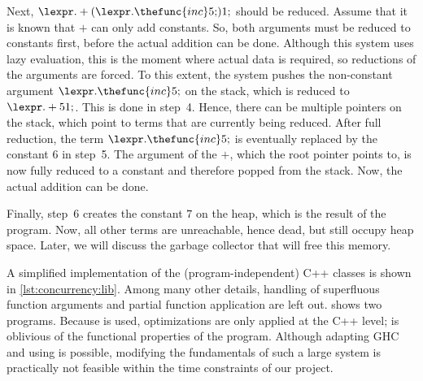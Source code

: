 Next, $\lexpr.+ ({\lexpr.\thefunc{inc} 5;}) 1;$ should be reduced.
Assume that it is known that $+$ can only add constants.
So, both arguments must be reduced to constants first, before the actual addition can be done.
Although this system uses lazy evaluation, this is the moment where actual data is required, so reductions of the arguments are forced.
To this extent, the system pushes the non-constant argument $\lexpr.\thefunc{inc} 5;$ on the stack, which is reduced to $\lexpr.+ 5 1;$.
This is done in step~4.
Hence, there can be multiple pointers on the stack, which point to terms that are currently being reduced.
After full reduction, the term $\lexpr.\thefunc{inc} 5;$ is eventually replaced by the constant $6$ in step~5.
The argument of the $+$, which the root pointer points to, is now fully reduced to a constant and therefore popped from the stack.
Now, the actual addition can be done.

Finally, step~6 creates the constant $7$ on the heap, which is the result of the program.
Now, all other terms are unreachable, hence dead, but still occupy heap space.
Later, we will discuss the garbage collector that will free this memory.

A simplified implementation of the (program-independent) C++ classes is shown in \vref{lst:concurrency:lib}.
Among many other details, handling of superfluous function arguments and partial function application are left out.
 shows two programs.
Because  is used, optimizations are only applied at the C++ level;  is oblivious of the functional properties of the program.
Although adapting \ac{GHC} and using  is possible, modifying the fundamentals of such a large system is practically not feasible within the time constraints of our project.

